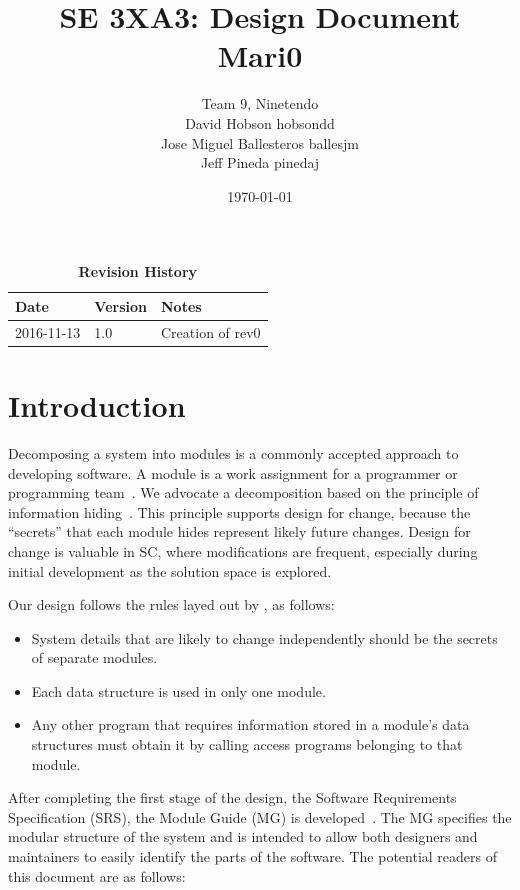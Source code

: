 \documentclass[12pt, titlepage]{article}
\title{SE 3XA3: Design Document\\Mari0}
\author{Team 9, Ninetendo
		\\ David Hobson hobsondd
		\\ Jose Miguel Ballesteros ballesjm
		\\ Jeff Pineda pinedaj
}
\date{\today}
\begin{document}
\maketitle

\tableofcontents
\listoftables
\listoffigures

\begin{table}[bp]
\caption{\bf Revision History}
\begin{tabularx}{\textwidth}{p{3cm}p{2cm}X}
\toprule {\bf Date} & {\bf Version} & {\bf Notes}\\
\midrule
2016-11-13 & 1.0 & Creation of rev0\\
\bottomrule
\end{tabularx}
\end{table}

\newpage


\section{Introduction}

Decomposing a system into modules is a commonly accepted approach to developing
software.  A module is a work assignment for a programmer or programming
team~\citep{ParnasEtAl1984}.  We advocate a decomposition
based on the principle of information hiding~\citep{Parnas1972a}.  This
principle supports design for change, because the ``secrets'' that each module
hides represent likely future changes.  Design for change is valuable in SC,
where modifications are frequent, especially during initial development as the
solution space is explored.  

Our design follows the rules layed out by \citet{ParnasEtAl1984}, as follows:
\begin{itemize}
\item System details that are likely to change independently should be the
  secrets of separate modules.
\item Each data structure is used in only one module.
\item Any other program that requires information stored in a module's data
  structures must obtain it by calling access programs belonging to that module.
\end{itemize}

After completing the first stage of the design, the Software Requirements
Specification (SRS), the Module Guide (MG) is developed~\citep{ParnasEtAl1984}. The MG
specifies the modular structure of the system and is intended to allow both
designers and maintainers to easily identify the parts of the software.  The
potential readers of this document are as follows:
\end{document}
